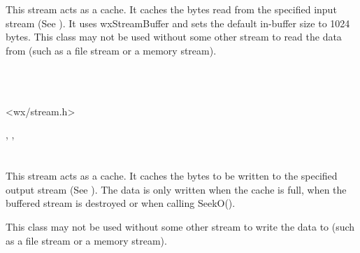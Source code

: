 \section{}\label{wxbufferedinputstream}

This stream acts as a cache. It caches the bytes read from the specified
input stream (See ).
It uses wxStreamBuffer and sets the default in-buffer size to 1024 bytes.
This class may not be used without some other stream to read the data
from (such as a file stream or a memory stream).


\\
\\


<wx/stream.h>




, ,

\section{}\label{wxbufferedoutputstream}

This stream acts as a cache. It caches the bytes to be written to the specified
output stream (See ). The
data is only written when the cache is full, when the buffered stream is
destroyed or when calling SeekO().

This class may not be used without some other stream to write the data
to (such as a file stream or a memory stream).



